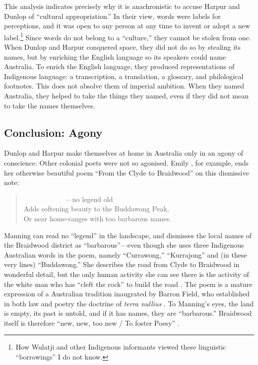 \documentclass[
  Crown,
  times,
  sageh]{sagej}
\begin{document}
This analysis indicates precisely why it is anachronistic to accuse
Harpur and Dunlop of ``cultural appropriation.'' In their view, words
were labels for perceptions, and it was open to any person at any time
to invent or adopt a new label.\footnote{How Wulatji and other
  Indigenous informants viewed these linguistic ``borrowings'' I do not
  know.} Since words do not belong to a ``culture,'' they cannot be
stolen from one. When Dunlop and Harpur conquered space, they did not do
so by stealing its names, but by enriching the English language so its
speakers could name Australia. To enrich the English language, they
produced representations of Indigenous language: a transcription, a
translation, a glossary, and philological footnotes. This does not
absolve them of imperial ambition. When they named Australia, they
helped to take the things they named, even if they did not mean to take
the names themselves.

\subsection{Conclusion: Agony}\label{conclusion-agony}

Dunlop and Harpur make themselves at home in Australia only in an agony
of conscience. Other colonial poets were not so agonised. Emily
\citet[43]{manning_balance_1877}, for example, ends her otherwise
beautiful poem ``From the Clyde to Braidwood'' on this dismissive note:

\begin{quote}
~~~~~~~~~~~~---no legend old\\
Adds softening beauty to the Buddawong Peak,\\
Or near home-ranges with too barbarous names.
\end{quote}

Manning can read no ``legend'' in the landscape, and dismisses the local
names of the Braidwood district as ``barbarous''---even though she uses
three Indigenous Australian words in the poem, namely ``Currawong,''
``Kurrajong'' and (in these very lines) ``Buddawong.'' She describes the
road from Clyde to Braidwood in wonderful detail, but the only human
activity she can see there is the activity of the white man who has
``cleft the rock'' to build the road \citep[42]{manning_balance_1877}.
The poem is a mature expression of a Australian tradition inaugrated by
Barron Field, who established in both law and poetry the doctrine of
\emph{terra nullius} \citep{ford_barron_2023}. To Manning's eyes, the
land is empty, its past is untold, and if it has names, they are
``barbarous.'' Braidwood itself is therefore ``new, new, too new / To
foster Poesy'' \citep[43]{manning_balance_1877}.
\end{document}
